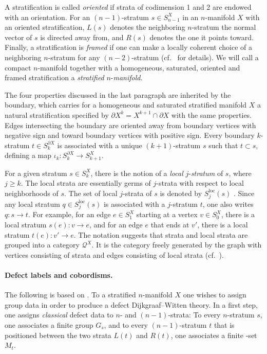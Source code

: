 \documentclass[10pt,a4paper]{amsart}
\numberwithin{equation}{section}
\theoremstyle{definition}
\begin{document}
A stratification is called \textit{oriented} if strata of codimension 1 and 2 are endowed with an orientation. For an $(n-1)$-stratum $s \in S_{n-1}^X$ in an $n$-manifold $X$ with an oriented stratification, $L(s)$ denotes the neighboring $n$-stratum the normal vector of $s$ is directed away from, and $R(s)$ denotes the one it points toward.
Finally, a stratification is \textit{framed} if one can make a locally coherent choice of a neighboring $n$-stratum for any $(n-2)$-stratum (cf.\ \cite[Definition~3.10]{FMM} for details). We will call a compact $n$-manifold together with a homogeneous, saturated, oriented and framed stratification a \textit{stratified} $n$-\textit{manifold}.

The four properties discussed in the last paragraph are inherited by the boundary, which carries for a homogeneous and saturated stratified manifold $X$ a natural stratification specified by $\partial X^k = X^{k+1} \cap \partial X$ with the same properties. Edges intersecting the boundary are oriented away from boundary vertices with negative sign and toward boundary vertices with positive sign. Every boundary $k$-stratum $t \in S_k^{\partial X}$ is associated with a unique $(k+1)$-stratum $s$ such that $t \subset s$, defining a map $\iota_k\colon S_k^{\partial X} \rightarrow S_{k+1}^X$.

For a given stratum $s \in S_k^X$, there is the notion of a \textit{local} $j$-\textit{stratum} of $s$, where $j \geq k$. The local strata are essentially germs of $j$-strata with respect to local neighborhoods of $s$. The set of local $j$-strata of $s$ is denoted by $S_j^{\mathrm{loc}}(s)$ \cite[Definition 3.13]{FMM}. Since any local stratum $q \in S_j^{\mathrm{loc}}(s)$ is associated with a $j$-stratum $t$, one also writes $q\colon s \rightarrow t$. For example, for an edge $e \in S_1^X$ starting at a vertex $v \in S_0^X$, there is a local stratum $s(e)\colon v \rightarrow e$, and for an edge $e$ that ends at $v'$, there is a local stratum $t(e)\colon v' \rightarrow e$. The notation suggests that strata and local strata are grouped into a category $\mathcal{Q}^X$. It is the category freely generated by the graph with vertices consisting of strata and edges consisting of local strata (cf.\ \cite[Definition~3.22]{FMM}).

\paragraph{Defect labels and cobordisms.} The following is based on \cite[Section~4]{FMM}. To a stratified $n$-manifold $X$ one wishes to assign group data in order to produce a defect Dijkgraaf--Witten theory. In a first step, one assigns \textit{classical} defect data to $n$- and $(n-1)$-strata: To every $n$-stratum $s$, one associates a finite group $G_s$, and to every $(n-1)$-stratum $t$ that is positioned between the two strata $L(t)$ and $R(t)$, one associates a finite -set $M_t$.
\end{document}
